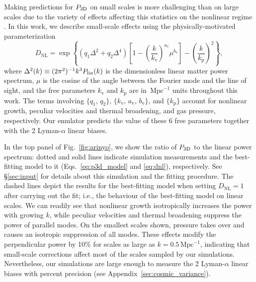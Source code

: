 \documentclass[fleqn,usenatbib]{mnras}
\newcommand{\lya}{Lyman-$\alpha$\xspace}
\newcommand{\pthreed}{\ensuremath{P_{\rm 3D}}\xspace}
\newcommand{\iMpc}{\ensuremath{\,\mathrm{Mpc}^{-1}}}
\begin{document}
Making predictions for \pthreed on small scales is more challenging than on large scales due to the variety of effects affecting this statistics on the nonlinear regime \citep[e.g.;][]{mcdonald2003MeasurementCosmologicalGeometry}. In this work, we describe small-scale effects using the physically-motivated \citet{arinyo-i-prats2015NonlinearPowerSpectrum} parameterization
%
\begin{equation}
    \label{eq:dnl}
    D_\mathrm{NL} = \exp \left\{\left(q_1 \Delta^2 + q_2 \Delta^4\right) \left[1-\left(\frac{k}{k_\mathrm{v}}\right)^{a_\mathrm{v}} \mu^{b_\mathrm{v}}\right] - \left(\frac{k}{k_\mathrm{p}}\right)^2 \right\},
\end{equation}
%
where $\Delta^2(k)\equiv(2\pi^2)^{-1} k^3 P_\mathrm{lin}(k)$ is the dimensionless linear matter power spectrum, $\mu$ is the cosine of the angle between the Fourier mode and the line of sight, and the free parameters $k_\mathrm{v}$ and $k_\mathrm{p}$ are in $\iMpc$ units throughout this work. The terms involving $\{q_1,\,q_2\}$, $\{k_\mathrm{v},\, a_\mathrm{v},\, b_\mathrm{v}\}$, and $\{k_\mathrm{p}\}$ account for nonlinear growth, peculiar velocities and thermal broadening, and gas pressure, respectively. Our emulator predicts the value of these 6 free parameters together with the 2 \lya linear biases.

In the top panel of Fig.~\ref{fig:arinyo}, we show the ratio of \pthreed to the linear power spectrum: dotted and solid lines indicate simulation measurements and the best-fitting model to it (Eqs.~\ref{eq:p3d_model} and \ref{eq:dnl}), respectively. See \S\ref{sec:input} for details about this simulation and the fitting procedure. The dashed lines depict the results for the best-fitting model when setting $D_\mathrm{NL}=1$ after carrying out the fit; i.e., the behaviour of the best-fitting model on linear scales. We can readily see that nonlinear growth isotropically increases the power with growing $k$, while peculiar velocities and thermal broadening suppress the power of parallel modes. On the smallest scales shown, pressure takes over and causes an isotropic suppression of all modes. These effects modify the perpendicular power by 10\% for scales as large as $k=0.5\iMpc$, indicating that small-scale corrections affect most of the scales sampled by our simulations. Nevertheless, our simulations are large enough to measure the 2 \lya linear biases with percent precision (see Appendix~\ref{sec:cosmic_variance}).
\end{document}
